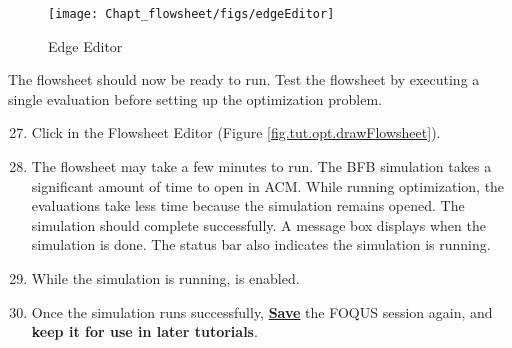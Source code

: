 \begin{figure}[H] 
	\begin{center} 
		\texttt{[image: Chapt\_flowsheet/figs/edgeEditor]}
		\caption{Edge Editor}
		\label{fig.tut.opt.edgeEditor}
	\end{center}
\end{figure}

The flowsheet should now be ready to run. Test the flowsheet by executing a single evaluation before setting up the optimization problem.

\begin{enumerate}
	\setcounter{enumi}{26}
	\item Click  in the Flowsheet Editor (Figure \ref{fig.tut.opt.drawFlowsheet}).
	\item The flowsheet may take a few minutes to run.  The BFB simulation takes a significant amount of time to open in ACM. While running optimization, the evaluations take less time because the simulation remains opened. The simulation should complete successfully. A message box displays when the simulation is done. The status bar also indicates the simulation is running.
	\item While the simulation is running,  is enabled.
	\item Once the simulation runs successfully, \textbf{\underline{Save}} the FOQUS session again, and \textbf{keep it for use in later tutorials}.
\end{enumerate}
